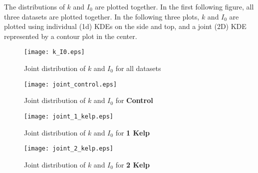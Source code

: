 The distributions of $k$ and $I_0$ are plotted together. In the first following figure, all three datasets are plotted together. In the following three plots, $k$ and $I_0$ are plotted using individual (1d) KDEs on the side and top, and a joint (2D) KDE represented by a contour plot in the center.

\begin{figure}[H]
	\centering
	\texttt{[image: k\_I0.eps]}
	\caption{Joint distribution of $k$ and $I_0$ for all datasets}
\end{figure}

\begin{figure}[H]
	\centering
	\texttt{[image: joint\_control.eps]}
	\caption{Joint distribution of $k$ and $I_0$ for \textbf{Control}}
	\label{joint_control}
\end{figure}

\begin{figure}[H]
	\centering
	\texttt{[image: joint\_1\_kelp.eps]}
	\caption{Joint distribution of $k$ and $I_0$ for \textbf{1 Kelp}}
	\label{joint_1_kelp}
\end{figure}

\begin{figure}[H]
	\centering
	\texttt{[image: joint\_2\_kelp.eps]}
	\caption{Joint distribution of $k$ and $I_0$ for \textbf{2 Kelp}}
	\label{joint_2_kelp}
\end{figure}

